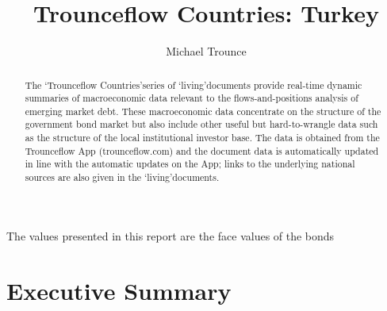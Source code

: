 \documentclass[11pt, oneside]{article}      %
\title{Trounceflow Countries: Turkey}
\author{Michael Trounce}
\numberwithin{table}{section}
\begin{document}

\maketitle
\begin{abstract}
   The \lq{Trounceflow Countries}\rq series of \lq{living}\rq documents provide real-time dynamic summaries of macroeconomic data relevant to the flows-and-positions analysis of emerging market
debt. These macroeconomic data concentrate on the structure of the government bond market
but also include other useful but hard-to-wrangle data such as the structure of the local institutional investor base. The data is obtained from the Trounceflow App (trounceflow.com) and
the document data is automatically updated in line with the automatic updates on the App;
links to the underlying national sources are also given in the \lq{living}\rq documents.
\end{abstract}

\begin{center}
\vfill{The values presented in this report are the face values of the bonds}
\end{center}

\pagebreak

\tableofcontents

\pagebreak

\section{Executive Summary}
\end{document}
